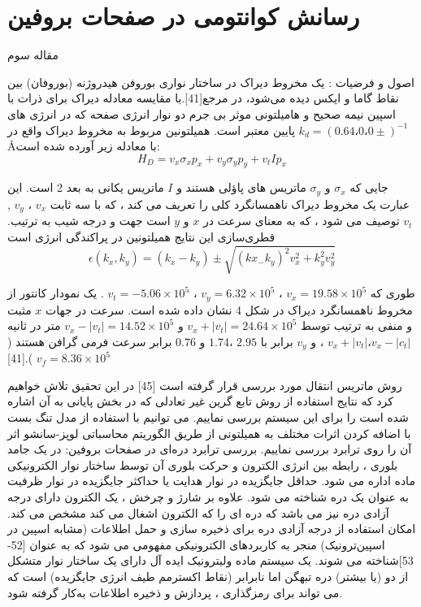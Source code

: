 \section{رسانش کوانتومی در صفحات بروفین}
مقاله سوم


اصول و فرضيات :
یک مخروط دیراک در ساختار نواری بوروفن هیدروژنه (بوروفان) بین نقاط گاما و ایکس دیده می‌شود، در مرجع[41].با مقایسه معادله دیراک برای ذرات با اسپین نیمه صحیح و هامیلتونی موثر بی جرم دو نوار انرژی صفحه که در انرژی های پایین معتبر است. همیلتونین مربوط به مخروط دیراک واقع در $k_d = (0.64،0،0 ±)^{-1}$\AA با معادله زیر آورده شده است:
$$
H_D = v_x \sigma_x p_x + v_y \sigma_y p_y + v_t I p_x
$$

جایی که $\sigma_x$ و $\sigma_y$ ماتریس های پاؤلی هستند و $I$ ماتریس یکانی به بعد 2 است. این عبارت یک مخروط دیراک  ناهمسانگرد کلی را تعریف می کند ، که با سه ثابت $v_x$ ، $v_y$ , $v_t$ توصیف می شود ، که به معنای سرعت در $x$ و $y$ است جهت و درجه شیب به ترتیب. قطری‌سازی این نتایج همیلتونین در پراکندگی انرژی است
$$
\epsilon(k_x,k_y) = (k_x - k_y) \pm \sqrt{(kx_ -k_y)^2 v_x^2 + k_y^2 v_y^2}
$$

طوری که $v_x = 19.58\times 10^5$  ، $v_y = 6.32\times 10^5$  ، $v_t = -5.06\times 10^5$ . یک نمودار کانتور از مخروط ناهمسانگرد دیراک در شکل 4 نشان داده شده است. سرعت در جهات $x$ مثبت و منفی به ترتیب توسط $v_x + | v_t | = 24.64 \times 10^5$   و $v_x - | v_t | = 14.52 \times 10^5$ متر در ثانیه $v_x + | v_t | ، v_x - | c_t|$ ، و $v_y$ برابر با $2.95$ ،$ 1.74$ و $0.76$ برابر سرعت فرمی گرافن هستند ($v_f =8.36\times 10^5$  ).[41]

روش ماتریس انتقال مورد بررسی قرار گرفته است [45] در این تحقیق تلاش خواهیم کرد که نتایج استفاده از روش تابع گرین غیر تعادلی که در بخش پایانی به آن اشاره شده است را برای این سیستم بررسی نماییم. می توانیم با استفاده از مدل تنگ بست با اضافه کردن اثرات مختلف به همیلتونی از طریق الگوریتم محاسباتی لوپز-سانشو اثر آن را روی ترابرد بررسی نماییم.
بررسی ترابرد دره‌ای در صفحات بروفین:
در یک جامد بلوری ، رابطه بین انرژی الکترون و حرکت بلوری آن توسط ساختار نوار الکترونیکی ماده اداره می شود. حداقل جایگزیده در نوار هدایت یا حداکثر جایگزیده در نوار ظرفیت به عنوان یک دره شناخته می شود. علاوه بر شارژ و چرخش ، یک الکترون دارای درجه آزادی دره نیز می باشد که دره ای را که الکترون اشغال می کند مشخص می کند. امکان استفاده از درجه آزادی دره برای ذخیره سازی و حمل اطلاعات (مشابه اسپین در اسپین‌ترونیک) منجر به کاربردهای الکترونیکی مفهومی می شود که به عنوان  [52-53]شناخته می شوند. یک سیستم ماده ولیترونیک ایده آل دارای یک ساختار نوار متشکل از دو (یا بیشتر) دره تبهگن اما نابرابر (نقاط اکسترمم طیف انرژی جایگزیده) است که می تواند برای رمزگذاری ، پردازش و ذخیره اطلاعات به‌کار گرفته شود.

